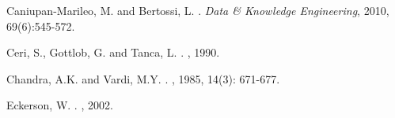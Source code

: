 \documentclass[format=acmsmall, review=false, screen=true]{acmart}
\newcommand{\ignore}[1]{}
\begin{document}
\begin{thebibliography}{1}

Caniupan-Marileo, M. and Bertossi, L. . {\em Data \& Knowledge Engineering}, 2010, 69(6):545-572.

Ceri, S., Gottlob, G. and Tanca, L.
.
, 1990.

Chandra, A.K. and Vardi, M.Y.
.
, 1985, 14(3): 671-677.

\ignore{
\bibitem[Chiang \& Miller(2011)]{chiang11}
Chiang, F. and Miller, R.
\newblock{A Unified Model for Data and Constraint Repair}.
In \newblock{\em Proc. of the International Conference on Data Engineering (ICDE)}, 2011, pp. 446-457. }



\ignore{
\bibitem{das}
Ganti,~V. and Das Sarma,~A. {\em Data Cleaning. A Practical Perspective}. \newblock{Morgan \& Claypool}, 2013.}




Eckerson, W.
.
, 2002.


\end{thebibliography}
\end{document}
